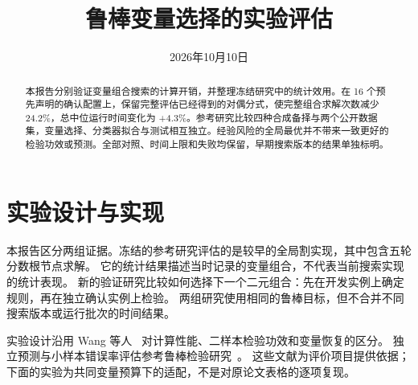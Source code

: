 \documentclass[11pt,a4paper]{article}
\title{鲁棒变量选择的实验评估}
\author{}
\date{2026年10月10日}
\makeatletter
\renewcommand{\maketitle}{\begin{center}{\Large\bfseries\@title\par}\vspace{4pt}
{\small\@date\par}\end{center}\vspace{2pt}}
\makeatother
\begin{document}
\maketitle
\begin{abstract}
本报告分别验证变量组合搜索的计算开销，并整理冻结研究中的统计效用。在 16 个预先声明的确认配置上，保留完整评估已经得到的对偶分式，使完整组合求解次数减少 24.2\%，总中位运行时间变化为 +4.3\%。参考研究比较四种合成备择与两个公开数据集，变量选择、分类器拟合与测试相互独立。经验风险的全局最优并不带来一致更好的检验功效或预测。全部对照、时间上限和失败均保留，早期搜索版本的结果单独标明。
\end{abstract}

\section{实验设计与实现}\label{sec:design}
本报告区分两组证据。冻结的参考研究评估的是较早的全局割实现，其中包含五轮分数根节点求解。
它的统计结果描述当时记录的变量组合，不代表当前搜索实现的统计表现。
新的验证研究比较如何选择下一个二元组合：先在开发实例上确定规则，再在独立确认实例上检验。
两组研究使用相同的鲁棒目标，但不合并不同搜索版本或运行批次的时间结果。

实验设计沿用 Wang 等人~\cite{wang} 对计算性能、二样本检验功效和变量恢复的区分。
独立预测与小样本错误率评估参考鲁棒检验研究~\cite{xie,sinkhorn,neural}。
这些文献为评价项目提供依据；下面的实验为共同变量预算下的适配，不是对原论文表格的逐项复现。
\end{document}
